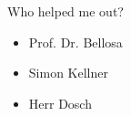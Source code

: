 

Who helped me out?

\begin{itemize}

\item Prof. Dr. Bellosa

\item Simon Kellner

\item Herr Dosch

\end{itemize}

